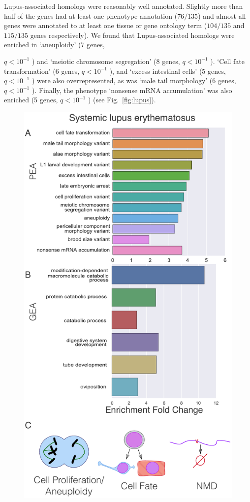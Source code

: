 \documentclass[10pt,letterpaper,twocolumn]{article}
\newcommand{\wlupus}{135}
\newcommand{\qval}[1]{
                      \ensuremath{
                                  q<10^{-#1}
                                  }
                      }
\begin{document}
Lupus-associated homologs were reasonably well annotated. Slightly more than half
of the genes had at least one phenotype annotation ($76/\wlupus{}$) and almost
all genes were annotated to at least one tissue or gene ontology term
($104/\wlupus{}$ and $115/\wlupus$ genes respectively).
We found that Lupus-associated homologs were enriched in `aneuploidy' (7 genes,
\qval{1}) and `meiotic chromosome segregation' (8 genes, \qval{1}). `Cell fate
transformation' (6 genes, \qval{1}), and `excess intestinal cells'
(5 genes, \qval{1}) were also overrepresented, as was `male tail morphology'
(6 genes, \qval{1}). Finally, the phenotype `nonsense mRNA accumulation' was also
enriched (5 genes, \qval{1}) (see Fig.~\ref{fig:lupus}).

\begin{figure}[htbp]
  \renewcommand{\familydefault}{\sfdefault}\normalfont{}
  \centering
  \includegraphics[width=\linewidth]{systemic-lupus.pdf}

\end{figure}
\end{document}
